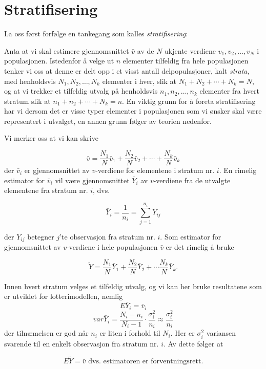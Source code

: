 \section{Stratifisering}
La oss først forfølge en tankegang som kalles {\em stratifisering}:

Anta at vi skal estimere gjennomsnittet $\bar{v}$ av de $N$ ukjente verdiene
$v_1, v_2, \ldots, v_N$ i populasjonen.  Istedenfor å velge ut $n$
elementer tilfeldig fra hele populasjonen tenker vi oss at denne er delt opp
i et visst antall delpopulasjoner, kalt {\em strata}, med henholdsvis $N_1,
N_2, \ldots, N_k$ elementer i hver, slik at $N_1 + N_2 + \cdots + N_k = N$,
og at vi trekker et tilfeldig utvalg på henholdsvis $n_1, n_2, \ldots,
n_k$ elementer fra hvert stratum slik at $n_1 + n_2 + \cdots + N_k = n$.  En
viktig grunn for å foreta stratifisering har vi dersom det er visse typer
elementer i populasjonen som vi ønsker skal være representert i 
utvalget, en annen grunn følger av teorien nedenfor.

Vi merker oss at vi kan skrive

\[ \bar{v}=\frac{N_1}{N}{\bar{v}}_1+\frac{N_2}{N}{\bar{v}}_2+ \cdots
                          +  \frac{N_k}{N}{\bar{v}}_k \]
\noindent der ${\bar v}_i$ er gjennomsnittet av $v$-verdiene for elementene
i stratum nr. $i$.  En rimelig estimator for ${\bar v}_i$ vil være
gjennomsnittet ${\bar Y}_i$ av $v$-verdiene fra de utvalgte elementene fra
stratum nr. $i$, dvs.

\[  {\bar{Y}}_i=\frac{1}{n_i}=\sum_{j=1}^{n_i}Y_{ij}     \]

\noindent der $Y_{ij}$ betegner $j$'te observasjon fra stratum nr. $i$.
Som estimator for gjennomsnittet av $v$-verdiene i hele populasjonen
$\bar{v}$ er det rimelig å bruke

\[ \tilde{Y}=\frac{N_1}{N}{\bar{Y}}_1+\frac{N_2}{N}{\bar{Y}}_2+ \cdots
                            \frac{N_k}{N}{\bar{Y}}_k .\]

\noindent Innen hvert stratum velges et tilfeldig utvalg, og vi kan her bruke 
resultatene som er utviklet for lotterimodellen, nemlig
\[ E{\bar{Y}}_i={\bar{v}}_i      \]
\[ var{\bar{Y}}_i=\frac{N_i-n_i}{N_i-1}\cdot \frac{{\sigma}_i^2}{n_i}
                                     \approx \frac{{\sigma}_i^2}{n_i} \]
\noindent der tilnæmelsen er god når $n_i$ er liten i forhold til
$N_i$.  Her er ${\sigma}_i^2$ variansen svarende til en enkelt observasjon fra
stratum nr. $i$.  Av dette følger at

\[   E\tilde{Y} = \bar{v} \mbox{\ \ dvs. estimatoren er forventningsrett.} \]

